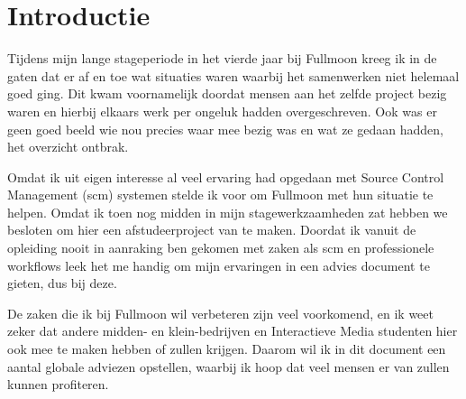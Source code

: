 \setcounter{chapter}{0}
\chapter{Introductie}
  
  Tijdens mijn lange stageperiode in het vierde jaar bij Fullmoon kreeg ik in de gaten dat er af en toe wat situaties waren waarbij het samenwerken niet helemaal goed ging. Dit kwam voornamelijk doordat mensen aan het zelfde project bezig waren en hierbij elkaars werk per ongeluk hadden overgeschreven. Ook was er geen goed beeld wie nou precies waar mee bezig was en wat ze gedaan hadden, het overzicht ontbrak.
  
  Omdat ik uit eigen interesse al veel ervaring had opgedaan met Source Control Management ({\sc scm}) systemen stelde ik voor om Fullmoon met hun situatie te helpen. Omdat ik toen nog midden in mijn stagewerkzaamheden zat hebben we besloten om hier een afstudeerproject van te maken. Doordat ik vanuit de opleiding nooit in aanraking ben gekomen met zaken als {\sc scm} en professionele workflows leek het me handig om mijn ervaringen in een advies document te gieten, dus bij deze.
  
  De zaken die ik bij Fullmoon wil verbeteren zijn veel voorkomend, en ik weet zeker dat andere midden- en klein-bedrijven en Interactieve Media studenten hier ook mee te maken hebben of zullen krijgen. Daarom wil ik in dit document een aantal globale adviezen opstellen, waarbij ik hoop dat veel mensen er van zullen kunnen profiteren.
  